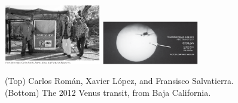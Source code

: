 \documentclass[10pt]{article}
\begin{document}
\begin{figure}[hb]
\centering
\includegraphics[width=0.375\textwidth]{figures/roman_lopez_salvatierra.png}
\includegraphics[width=0.375\textwidth]{figures/venus.png}
\caption{\label{fig:franklin2} \small (Top) Carlos Rom\'{a}n, Xavier L\'{o}pez, and Fransisco Salvatierra. (Bottom) The 2012 Venus transit, from Baja California.}
\end{figure}
\end{document}
